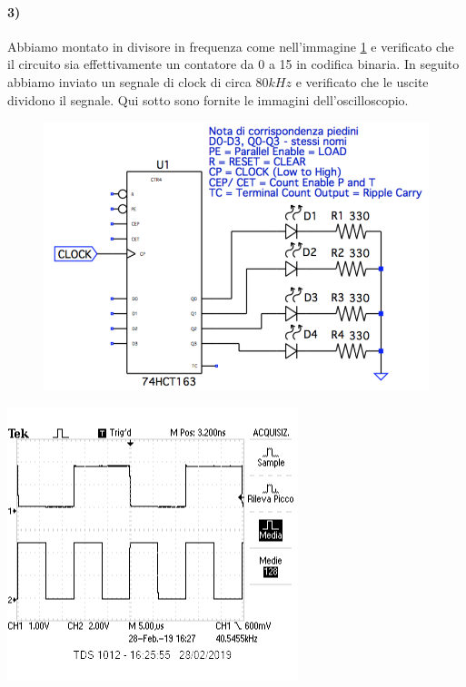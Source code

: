 \documentclass{article}
\begin{document}
\paragraph{3)}
	Abbiamo montato in divisore in frequenza come nell'immagine \ref{fig:div_freq1} e verificato che il circuito sia effettivamente un contatore da 0 a 15 in codifica binaria.
	In seguito abbiamo inviato un segnale di clock di circa $80 kHz$ e verificato che le uscite dividono il segnale. Qui sotto sono fornite le immagini dell'oscilloscopio.\newline
	\begin{figure}
	\begin{center}
		\includegraphics[width=0.5\linewidth]{immagini/div_freq1}
		\label{fig:div_freq1}
	\end{center}
	\end{figure}
	\newline
	\begin{minipage}{.5\linewidth}
		\centering
		\includegraphics[width=\linewidth]{immagini/f1_2}
		\label{fig:f1_2}
	\end{minipage}
\end{document}
